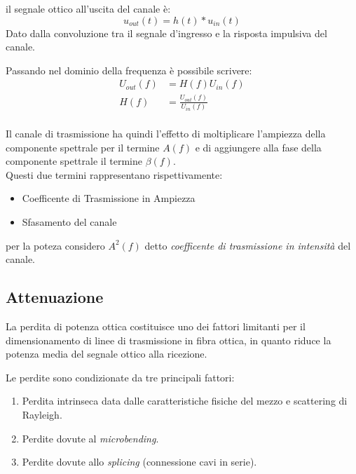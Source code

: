 \documentclass[12pt, a4paper]{article}
\begin{document}
il segnale ottico all'uscita del canale è:
\begin{equation}
	u_{out}(t) = h(t) \ast u_{in}(t)
\end{equation}
Dato dalla convoluzione tra il segnale d'ingresso e la risposta impulsiva del canale.

Passando nel dominio della frequenza è possibile scrivere:
\begin{align*}
	U_{out}(f) &= H(f)U_{in}(f)\\
	H(f) &= \frac{U_{out}(f)}{U_{in}(f)}\\
\end{align*}

Il canale di trasmissione ha quindi l'effetto di moltiplicare l'ampiezza della componente spettrale per il termine $A(f)$ e di aggiungere alla fase della componente spettrale il termine $\beta(f)$.\\
Questi due termini rappresentano rispettivamente:
\begin{itemize}
	\item Coefficente di Trasmissione in Ampiezza
	\item Sfasamento del canale
\end{itemize}

per la poteza considero $A^2(f)$ detto \textit{coefficente di trasmissione in intensità} del canale. 


\newpage
\subsection{Attenuazione}
\label{sub:attenuazione}

La perdita di potenza ottica costituisce uno dei fattori limitanti per il dimensionamento di linee di trasmissione in fibra ottica, in quanto riduce la potenza media del segnale ottico alla ricezione.

Le perdite sono condizionate da tre principali fattori:
\begin{enumerate}
	\item Perdita intrinseca data dalle caratteristiche fisiche del mezzo e scattering di Rayleigh.
	
	
	
	\item Perdite dovute al \textit{microbending}.
	\item Perdite dovute allo \textit{splicing} (connessione cavi in serie).
\end{enumerate}
\end{document}
